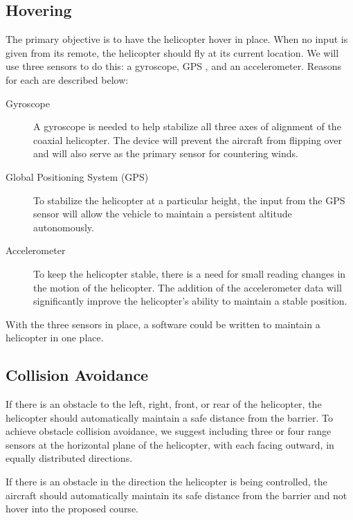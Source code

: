 \documentclass[onecolumn, draftclsnofoot,10pt, compsoc]{IEEEtran}
\begin{document}
\subsection{Hovering}
The primary objective is to have the helicopter hover in place. When no input is given from its remote, the helicopter should fly at its current location. We will use three sensors to do this: a gyroscope, GPS , and an accelerometer. Reasons for each are described below:
\begin{description}
\item[Gyroscope] A gyroscope is needed to help stabilize all three axes of alignment of the coaxial helicopter. The device will prevent the aircraft from flipping over and will also serve as the primary sensor for countering winds.
\item[Global Positioning System (GPS)] To stabilize the helicopter at a particular height, the input from the GPS sensor will allow the vehicle to maintain a persistent altitude autonomously.

\item[Accelerometer] To keep the helicopter stable, there is a need for small reading changes in the motion of the helicopter. The addition of the accelerometer data will significantly improve the helicopter’s ability to maintain a stable position.
\end{description}
With the three sensors in place, a software could be written to maintain a helicopter in one place.


\subsection{Collision Avoidance}
If there is an obstacle to the left, right, front, or rear of the helicopter, the helicopter should automatically maintain a safe distance from the barrier. To achieve obstacle collision avoidance, we suggest including three or four range sensors at the horizontal plane of the helicopter, with each facing outward, in equally distributed directions.

If there is an obstacle in the direction the helicopter is being controlled, the aircraft should automatically maintain its safe distance from the barrier and not hover into the proposed course.
\end{document}
